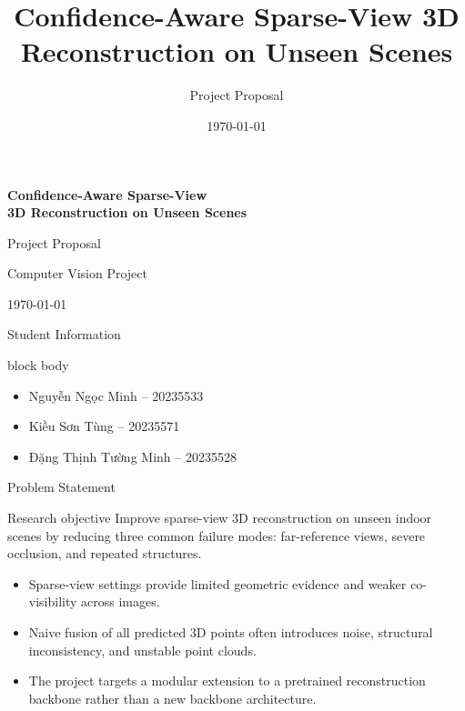 \documentclass[aspectratio=169,11pt]{beamer}
\title{Confidence-Aware Sparse-View 3D Reconstruction on Unseen Scenes}
\subtitle{Project Proposal}
\author{}
\institute{Computer Vision Project}
\date{\today}
\begin{document}
\begin{frame}[plain]
\vspace{0.9cm}
\begin{center}
{\LARGE\bfseries\color{navy} Confidence-Aware Sparse-View\\[0.15em]3D Reconstruction on Unseen Scenes\par}
\vspace{0.35cm}
{\large Project Proposal\par}
\vspace{1.55cm}
{\normalsize Computer Vision Project\par}
\vspace{0.2cm}
{\normalsize \today\par}
\end{center}
\end{frame}

\begin{frame}{Student Information}
\begin{beamercolorbox}[rounded=true,shadow=true,wd=0.96\paperwidth,sep=0.6em]{block body}
\begin{itemize}
    \item Nguyễn Ngọc Minh -- 20235533
    \item Kiều Sơn Tùng -- 20235571
    \item Đặng Thịnh Tường Minh -- 20235528
\end{itemize}
\end{beamercolorbox}
\end{frame}

\begin{frame}{Problem Statement}
\begin{block}{Research objective}
Improve sparse-view 3D reconstruction on unseen indoor scenes by reducing three common failure modes: far-reference views, severe occlusion, and repeated structures.
\end{block}

\begin{itemize}
    \item Sparse-view settings provide limited geometric evidence and weaker co-visibility across images.
    \item Naive fusion of all predicted 3D points often introduces noise, structural inconsistency, and unstable point clouds.
    \item The project targets a modular extension to a pretrained reconstruction backbone rather than a new backbone architecture.
\end{itemize}
\end{frame}
\end{document}
